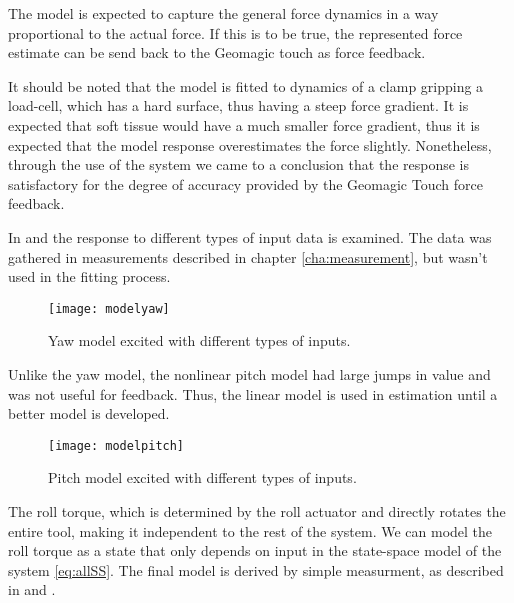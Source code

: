 The model is expected to capture the general force dynamics in a way proportional to the actual force. If this is to be true, the represented force estimate can be send back to the Geomagic touch as force feedback.

It should be noted that the model is fitted to dynamics of a clamp gripping a load-cell, which has a hard surface, thus having a steep force gradient.
It is expected that soft tissue would have a much smaller force gradient, thus it is expected that the model response overestimates the force slightly.
Nonetheless, through the use of the system we came to a conclusion that the response is satisfactory for the degree of accuracy provided by the Geomagic Touch force feedback.

In  and  the response to different types of input data is examined.
The data was gathered in measurements described in chapter \ref{cha:measurement}, but wasn't used in the fitting process.


\begin{figure}[H]
\hspace{-3em}\texttt{[image: modelyaw]}
\caption{Yaw model excited with different types of inputs.}
\label{fig:final_res_yaw}
\end{figure}

Unlike the yaw model, the nonlinear pitch model had large jumps in value and was not useful for feedback.
Thus, the linear model is used in estimation until a better model is developed.

\begin{figure}[H]
\hspace{-2.5em}\texttt{[image: modelpitch]}
\caption{Pitch model excited with different types of inputs.}
\label{fig:final_res_pitch}
\end{figure}

The roll torque, which is determined by the roll actuator and directly rotates the entire tool, making it independent to the rest of the system.
We can model the roll torque as a state that only depends on input in the state-space model of the system \ref{eq:allSS}.
The final model is derived by simple measurment, as described in  and .

